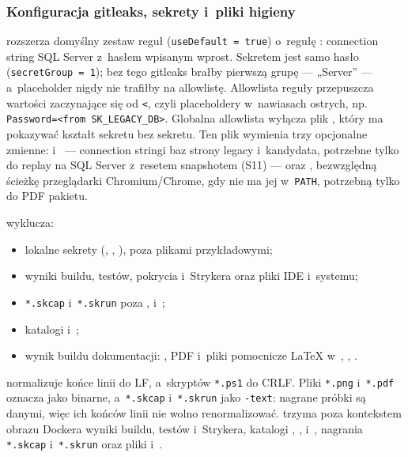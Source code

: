 \subsubsection{Konfiguracja gitleaks, sekrety i~pliki higieny}

 rozszerza domyślny zestaw reguł (\texttt{useDefault = true}) o~regułę
: connection string SQL Server z~hasłem
wpisanym wprost. Sekretem jest samo hasło (\texttt{secretGroup = 1}); bez tego gitleaks
brałby pierwszą grupę --- „Server” --- a~placeholder nigdy nie trafiłby na allowlistę.
Allowlista reguły przepuszcza wartości zaczynające się od \texttt{<}, czyli placeholdery w~nawiasach ostrych, np. \texttt{Password=<from SK\_LEGACY\_DB>}. Globalna allowlista wyłącza
plik , który ma pokazywać kształt sekretu bez sekretu. Ten plik
wymienia trzy opcjonalne zmienne:  i~
--- connection stringi baz strony legacy i~kandydata, potrzebne tylko do replay na SQL
Server z~resetem snapshotem (S11) --- oraz , bezwzględną ścieżkę
przeglądarki Chromium/Chrome, gdy nie ma jej w~\texttt{PATH}, potrzebną tylko do PDF pakietu.

 wyklucza:
\begin{itemize}
  \item lokalne sekrety (, , ), poza plikami
        przykładowymi;
  \item wyniki buildu, testów, pokrycia i~Strykera oraz pliki IDE i~systemu;
  \item \texttt{*.skcap} i~\texttt{*.skrun} poza , 
        i~;
  \item katalogi  i~;
  \item wynik buildu dokumentacji: , PDF i~pliki pomocnicze LaTeX
        w~, , .
\end{itemize}
 normalizuje końce linii do LF, a~skryptów \texttt{*.ps1} do CRLF.
Pliki \texttt{*.png} i~\texttt{*.pdf} oznacza jako binarne, a~\texttt{*.skcap}
i~\texttt{*.skrun} jako \texttt{-text}: nagrane próbki są danymi, więc ich końców linii
nie wolno renormalizować.  trzyma poza kontekstem obrazu Dockera
wyniki buildu, testów i~Strykera, katalogi , , 
i~, nagrania \texttt{*.skcap} i~\texttt{*.skrun} oraz pliki 
i~.

